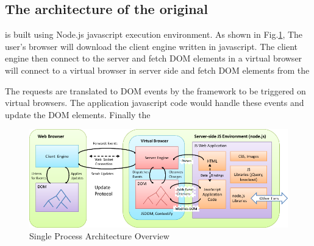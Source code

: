 \subsection{The architecture of the original \cb{}}
\cb{} is built using Node.js javascript execution environment. %
As shown in Fig.\ref{fig:cb1arch}, 
The user's browser will download the client engine written in javascript.
The client engine then connect to the server and fetch DOM elements in a
virtual browser
will connect to a virtual browser in server side and fetch DOM
elements from the 

The requests are translated to DOM events by the framework to be triggered on virtual browsers.
The application javascript code would handle these events and update the DOM elements.
Finally the 

\begin{figure}[h]
\centering
\includegraphics[width=\textwidth]{figs/cb1_architecture_overview}
\caption{Single Process \cb{} Architecture Overview}
\label{fig:cb1arch}
\end{figure}


